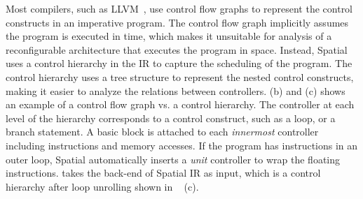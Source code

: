 Most compilers, such as LLVM~\cite{llvm}, use control flow graphs to represent the control constructs in an imperative program.
The control flow graph implicitly assumes the program is executed in time, which makes it unsuitable
for analysis of a reconfigurable architecture that executes the program in space. 
Instead, Spatial uses a control hierarchy in the IR to capture the scheduling of the program.
The control hierarchy uses a tree structure to represent the nested control constructs, making it
easier to analyze the relations between controllers.
 (b) and (c) shows an example of a control flow graph vs. a control hierarchy.
The controller at each level of the hierarchy corresponds to a control construct, such as a loop, or
a branch statement. 
A basic block is attached to each \emph{innermost} controller including instructions
and memory accesses.
If the program has instructions in an outer loop, Spatial automatically inserts a \emph{unit}
controller to wrap the floating instructions.
\name takes the back-end of Spatial IR as input, which is a control hierarchy after loop
unrolling shown in ~ (c).

